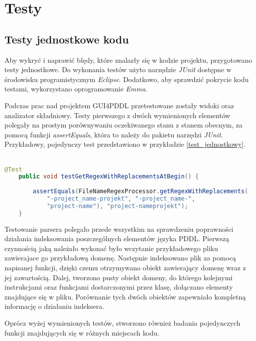 \chapter{Testy}
\section{Testy jednostkowe kodu}

Aby wykryć i naprawić błędy, które znalazły się w kodzie projektu, przygotowano testy jednostkowe. Do wykonania testów użyto narzędzie \textit{JUnit }dostępne w środowisku programistycznym \textit{Eclipse}. Dodatkowo, aby sprawdzić pokrycie kodu testami, wykorzystano oprogramowanie \textit{Emma}.

Podczas prac nad projektem GUI4PDDL przetestowane zostały widoki oraz analizator składniowy. Testy pierwszego z dwóch wymienionych elementów polegały na prostym porównywaniu oczekiwanego stanu z stanem obecnym, za pomocą funkcji \textit{assertEquals}, która to należy do pakietu narzędzi \textit{JUnit}. Przykładowy, pojedynczy test przedstawiono w przykładzie \ref{test_jednostkowy}.\\\\
\begin{Code}
\begin{lstlisting}[language=JAVA,frame=single,label={test_jednostkowy}, caption={Przykładowy test jedostkowy}]
	@Test
	public void testGetRegexWithReplacementsAtBegin() {
		
		assertEquals(FileNameRegexProcessor.getRegexWithReplacements(
			"-project_name-projekt", "-project_name-", 
			"project-name"), "project-nameprojekt");
	}
\end{lstlisting}
\end{Code}


Testowanie parsera polegało przede wszystkim na sprawdzeniu poprawności działania indeksowania poszczególnych elementów języka PDDL. Pierwszą czynnością jaką należało wykonać było wczytanie przykładowego pliku zawierajace go przykładową domenę. Następnie indeksowano plik za pomocą napisanej funkcji, dzięki czemu otrzymywano obiekt zawierający domenę wraz z jej zawartością. Dalej, tworzono pusty obiekt domeny, do którego kolejnymi instrukcjami oraz funkcjami dostarczonymi przez klasę, dołączano elementy znajdujące się w pliku. Porównanie tych dwóch obiektów zapewniało kompletną informację o działaniu indeksera.

Oprócz wyżej wymienionych testów, stworzono również badania pojedynczych funkcji znajdujących się w różnych miejscach kodu.

